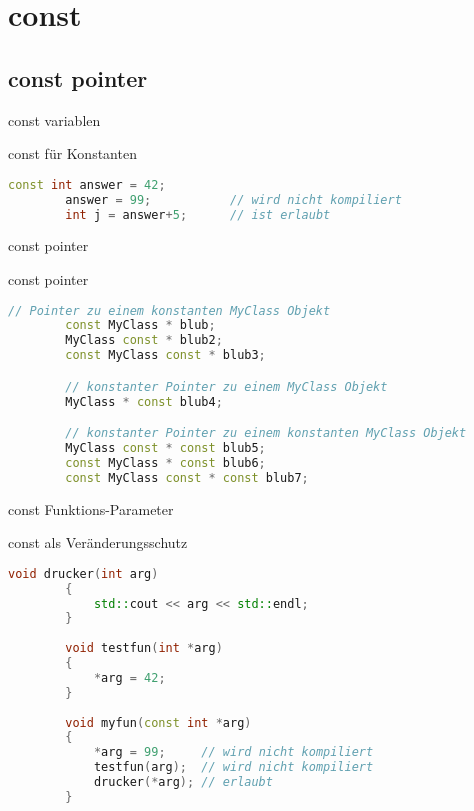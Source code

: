 \section{const}

\subsection{const pointer}

\begin{frame}[fragile]{const variablen}

	\begin{block}{const für Konstanten}
	\begin{lstlisting}[language=C++]
		const int answer = 42;
		answer = 99;           // wird nicht kompiliert
		int j = answer+5;      // ist erlaubt
	\end{lstlisting}
	\end{block}

\end{frame}


\begin{frame}[fragile]{const pointer}

	\begin{block}{const pointer}
	\begin{small}
	\begin{lstlisting}[language=C++]
		// Pointer zu einem konstanten MyClass Objekt
		const MyClass * blub;
		MyClass const * blub2;
		const MyClass const * blub3;

		// konstanter Pointer zu einem MyClass Objekt
		MyClass * const blub4;

		// konstanter Pointer zu einem konstanten MyClass Objekt
		MyClass const * const blub5; 
		const MyClass * const blub6; 
		const MyClass const * const blub7;
	\end{lstlisting}
	\end{small}
	\end{block}

\end{frame}


\begin{frame}[fragile]{const Funktions-Parameter}

	\begin{block}{const als Veränderungsschutz}
	\begin{small}
	\begin{lstlisting}[language=C++]
		void drucker(int arg)
		{
		    std::cout << arg << std::endl;
		}
		
		void testfun(int *arg)
		{
		    *arg = 42;
		}
		
		void myfun(const int *arg)
		{
		    *arg = 99;     // wird nicht kompiliert
		    testfun(arg);  // wird nicht kompiliert
		    drucker(*arg); // erlaubt
		}
	\end{lstlisting}
	\end{small}
	\end{block}

\end{frame}


